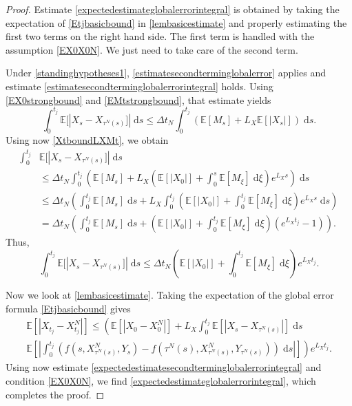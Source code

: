 \documentclass[reqno,12pt]{amsart}
\theoremstyle{plain}%
\theoremstyle{definition}
\begin{document}
\begin{proof}
    Estimate \eqref{expectedestimateglobalerrorintegral} is obtained by taking the expectation of \eqref{Etjbasicbound} in \cref{lembasicestimate} and properly estimating the first two terms on the right hand side. The first term is handled with the assumption \eqref{EX0X0N}. We just need to take care of the second term.
    
    Under \cref{standinghypotheses1}, \cref{estimatesecondterminglobalerror} applies and estimate \eqref{estimatesecondterminglobalerrorintegral} holds.
    Using \eqref{EX0strongbound} and \eqref{EMtstrongbound}, that estimate yields
    \[
        \int_0^{t_j} \mathbb{E}[|X_s - X_{\tau^N(s)}]| \;\mathrm{d}s \leq \Delta t_N \int_0^{t_j} (\mathbb{E}[M_s] + L_X\mathbb{E}[|X_s|]) \;\mathrm{d}s.
    \]
    Using now \eqref{XtboundLXMt}, we obtain
    \begin{align*}
        \int_0^{t_j} & \mathbb{E}[|X_s - X_{\tau^N(s)}]| \;\mathrm{d}s \\
        & \leq \Delta t_N \int_0^{t_j} \left(\mathbb{E}[M_s] + L_X\left(\mathbb{E}[|X_0|] + \int_0^s \mathbb{E}[M_\xi]\;\mathrm{d}\xi\right)e^{L_X s} \right)\;\mathrm{d}s \\
        & \leq \Delta t_N \left(\int_0^{t_j} \mathbb{E}[M_s] \;\mathrm{d}s + L_X \int_0^{t_j}\left(\mathbb{E}[|X_0|] + \int_0^{t_j} \mathbb{E}[M_\xi]\;\mathrm{d}\xi\right)e^{L_X s} \;\mathrm{d}s\right) \\
        & = \Delta t_N \left(\int_0^{t_j} \mathbb{E}[M_s] \;\mathrm{d}s + \left(\mathbb{E}[|X_0|] + \int_0^{t_j} \mathbb{E}[M_\xi]\;\mathrm{d}\xi\right)\left(e^{L_X t_j} - 1\right) \right).
    \end{align*}
    Thus,
    \begin{equation}
        \label{expectedestimatesecondterminglobalerrorintegral}
        \int_0^{t_j} \mathbb{E}[|X_s - X_{\tau^N(s)}]| \;\mathrm{d}s \leq \Delta t_N\left(\mathbb{E}[|X_0|] + \int_0^{t_j} \mathbb{E}[M_\xi]\;\mathrm{d}\xi\right)e^{L_X t_j}.
    \end{equation}

    Now we look at \cref{lembasicestimate}. Taking the expectation of the global error formula \eqref{Etjbasicbound} gives
    \begin{multline*}
        \mathbb{E}\left[|X_{t_j} - X_{t_j}^N|\right] \leq \left( \mathbb{E}\left[|X_0 - X_0^N|\right] + L_X \int_0^{t_j} \mathbb{E}\left[|X_s - X_{\tau^N(s)}|\right] \;\mathrm{d}s \right. \\
        \left. \mathbb{E}\left[\left|\int_0^{t_j} \left( f(s, X_{\tau^N(s)}^N, Y_s) - f(\tau^N(s), X_{\tau^N(s)}^N, Y_{\tau^N(s)}) \right)\;\mathrm{d}s\right|\right]\right) e^{L_X t_j}.
    \end{multline*}
    Using now estimate \eqref{expectedestimatesecondterminglobalerrorintegral} and condition \eqref{EX0X0N}, we find \eqref{expectedestimateglobalerrorintegral}, which completes the proof.
\end{proof}
\end{document}
